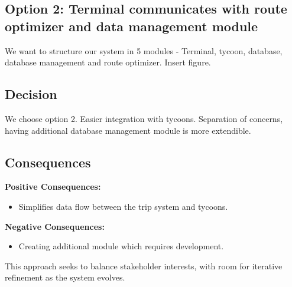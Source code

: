 \subsection*{Option 2: Terminal communicates with route optimizer and data management module}
We want to structure our system in 5 modules - Terminal, tycoon, database, database management and route optimizer.
Insert figure.

\subsection*{Decision}
We choose option 2.
Easier integration with tycoons.
Separation of concerns, having additional database management module is more extendible.

\subsection*{Consequences}
\textbf{Positive Consequences:}
\begin{itemize}
\item Simplifies data flow between the trip system and tycoons.
\end{itemize}
\textbf{Negative Consequences:}
\begin{itemize}
\item Creating additional module which requires development.
\end{itemize}
This approach seeks to balance stakeholder interests, with room for iterative refinement as the system evolves.
